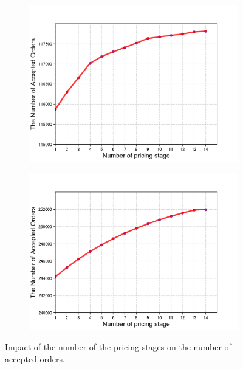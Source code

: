 \documentclass[sigconf,authordraft]{acmart}
\begin{document}
\begin{figure}[tb]
    \begin{subfigure}[b]{0.2\textwidth}
    \includegraphics[width=\textwidth]{stagenumber-c.png}
    \end{subfigure}
    \begin{subfigure}[b]{0.2\textwidth}
    \qquad
    \includegraphics[width=\textwidth]{stagenumber-d.png}
    \end{subfigure}
     \caption{Impact of the number of the pricing stages on the number of accepted orders.}
    \label{fig:stagenumber}
\end{figure}
\end{document}
